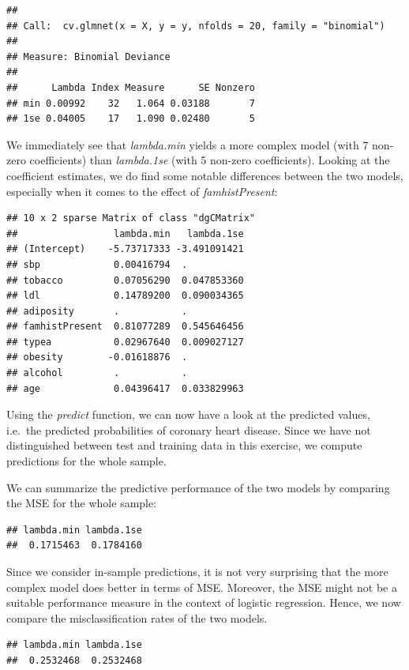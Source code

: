 \documentclass[
]{article}
\begin{document}
\begin{verbatim}
## 
## Call:  cv.glmnet(x = X, y = y, nfolds = 20, family = "binomial") 
## 
## Measure: Binomial Deviance 
## 
##      Lambda Index Measure      SE Nonzero
## min 0.00992    32   1.064 0.03188       7
## 1se 0.04005    17   1.090 0.02480       5
\end{verbatim}

We immediately see that \textit{lambda.min} yields a more complex model
(with 7 non-zero coefficients) than \textit{lambda.1se} (with 5 non-zero
coefficients). Looking at the coefficient estimates, we do find some
notable differences between the two models, especially when it comes to
the effect of \textit{famhistPresent}:

\begin{verbatim}
## 10 x 2 sparse Matrix of class "dgCMatrix"
##                 lambda.min   lambda.1se
## (Intercept)    -5.73717333 -3.491091421
## sbp             0.00416794  .          
## tobacco         0.07056290  0.047853360
## ldl             0.14789200  0.090034365
## adiposity       .           .          
## famhistPresent  0.81077289  0.545646456
## typea           0.02967640  0.009027127
## obesity        -0.01618876  .          
## alcohol         .           .          
## age             0.04396417  0.033829963
\end{verbatim}

Using the \textit{predict} function, we can now have a look at the
predicted values, i.e.~the predicted probabilities of coronary heart
disease. Since we have not distinguished between test and training data
in this exercise, we compute predictions for the whole sample.

We can summarize the predictive performance of the two models by
comparing the MSE for the whole sample:

\begin{verbatim}
## lambda.min lambda.1se 
##  0.1715463  0.1784160
\end{verbatim}

Since we consider in-sample predictions, it is not very surprising that
the more complex model does better in terms of MSE. Moreover, the MSE
might not be a suitable performance measure in the context of logistic
regression. Hence, we now compare the misclassification rates of the two
models.

\begin{verbatim}
## lambda.min lambda.1se 
##  0.2532468  0.2532468
\end{verbatim}
\end{document}
